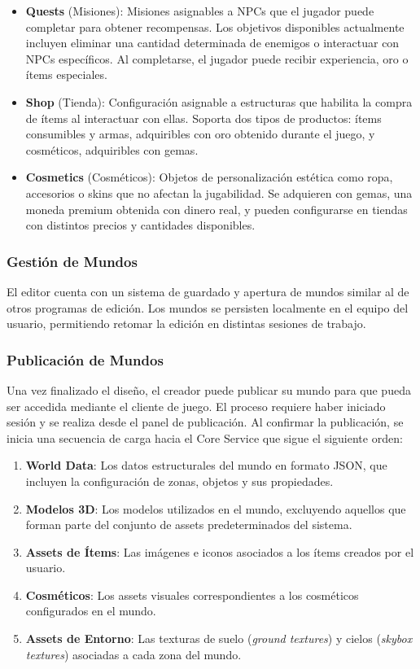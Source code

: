 \begin{itemize}
  \item \textbf{Quests} (Misiones): Misiones asignables a NPCs que el jugador puede completar para obtener 
  recompensas. Los objetivos disponibles actualmente incluyen eliminar una cantidad determinada de enemigos o 
  interactuar con NPCs específicos. Al completarse, el jugador puede recibir experiencia, oro o ítems especiales.

  \item \textbf{Shop} (Tienda): Configuración asignable a estructuras que habilita la compra de ítems al 
  interactuar con ellas. Soporta dos tipos de productos: ítems consumibles y armas, adquiribles con oro 
  obtenido durante el juego, y cosméticos, adquiribles con gemas.

  \item \textbf{Cosmetics} (Cosméticos): Objetos de personalización estética como ropa, accesorios o skins 
  que no afectan la jugabilidad. Se adquieren con gemas, una moneda premium obtenida con dinero real, y 
  pueden configurarse en tiendas con distintos precios y cantidades disponibles.
\end{itemize}

\subsubsection{Gestión de Mundos}

El editor cuenta con un sistema de guardado y apertura de mundos similar al de otros programas de edición. 
Los mundos se persisten localmente en el equipo del usuario, permitiendo retomar la edición en distintas sesiones de trabajo.

\subsubsection{Publicación de Mundos}

Una vez finalizado el diseño, el creador puede publicar su mundo para que pueda ser accedida mediante el cliente de juego.
El proceso requiere haber iniciado sesión y se realiza desde el panel de publicación. Al confirmar la publicación, 
se inicia una secuencia  de carga hacia el Core Service que sigue el siguiente orden:

\begin{enumerate}
  \item \textbf{World Data}: Los datos estructurales del mundo en formato JSON, que incluyen la configuración 
  de zonas, objetos y sus propiedades.
  \item \textbf{Modelos 3D}: Los modelos utilizados en el mundo, excluyendo aquellos que forman parte del 
  conjunto de assets predeterminados del sistema.
  \item \textbf{Assets de Ítems}: Las imágenes e iconos asociados a los ítems creados por el usuario.
  \item \textbf{Cosméticos}: Los assets visuales correspondientes a los cosméticos configurados en el mundo.
  \item \textbf{Assets de Entorno}: Las texturas de suelo (\textit{ground textures}) y cielos 
  (\textit{skybox textures}) asociadas a cada zona del mundo.
\end{enumerate}

